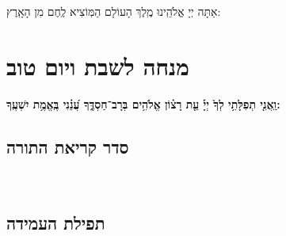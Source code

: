 \documentclass[twoside, openany, parskip=half, 11pt]{book}
\begin{document}
אַתָּה יְיָ אֱלֹהֵֽינוּ מֶֽלֶךְ הָעוֹלָם הַמּֽוֹצִיא לֶֽחֶם מִן הָאָֽרֶץ:



\chapter[מנחה לשבת ויום טוב]{ מנחה לשבת ויום טוב }

\ashrei

\uvaletzion

\halfkaddish


\textbf{וַֽאֲנִ֤י תְפִלָּתִ֥י לְךָ֙ יְיָ֡ עֵ֤ת רָצ֗וֹן אֱלֹהִ֥ים בְּרָב־חַסְדֶּ֑ךָ עֲ֝נֵ֗נִי בֶּֽאֱמֶ֥ת יִשְׁעֶֽךָ:} 


\section*{ סדר קריאת התורה }


\pesicha

\gadlu

\avharachamim

\vesigale


\torahbarachu

\hagomel

\nextpage
\hagbaha

\galila

\yehalelu

\\
\kafdalet

\nextpage
\etzchaim


\halfkaddish


\section*{ תפילת העמידה }
 

\amidaopening{\shabbosshuva}{}


\end{document}
